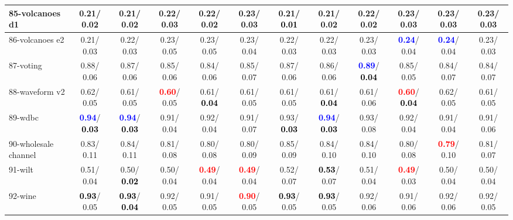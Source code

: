 \begin{table}[h]
\begin{center}
{\begin{tabular}{lc|c|c|c|c|c|c|c|c|c|c}
85-volcanoes d1 &   0.21/  0.02 &   0.21/  0.02 &   0.22/  0.03 &   0.22/  0.02 &   0.23/  0.03 &   0.21/\textcolor{black}{\textbf{  0.01}} &   0.21/  0.02 &   0.22/  0.02 &   0.23/  0.03 &   0.23/  0.03 &   0.23/  0.03 \\ \hline
86-volcanoes e2 &   0.21/  0.03 &   0.22/  0.03 &   0.23/  0.05 &   0.23/  0.05 &   0.23/  0.04 &   0.22/  0.03 &   0.22/  0.03 &   0.23/  0.03 & \textcolor{blue}{\textbf{  0.24}}/  0.04 & \textcolor{blue}{\textbf{  0.24}}/  0.04 &   0.23/  0.03 \\
87-voting &   0.88/  0.06 &   0.87/  0.06 &   0.85/  0.06 &   0.84/  0.06 &   0.85/  0.07 &   0.87/  0.06 &   0.86/  0.06 & \textcolor{blue}{\textbf{  0.89}}/\textcolor{black}{\textbf{  0.04}} &   0.85/  0.05 &   0.84/  0.07 &   0.84/  0.07 \\
88-waveform v2 &   0.62/  0.05 &   0.61/  0.05 & \textcolor{red}{\textbf{  0.60}}/  0.05 &   0.61/\textcolor{black}{\textbf{  0.04}} &   0.61/  0.05 &   0.61/  0.05 &   0.61/\textcolor{black}{\textbf{  0.04}} &   0.61/  0.06 & \textcolor{red}{\textbf{  0.60}}/\textcolor{black}{\textbf{  0.04}} &   0.62/  0.05 &   0.61/  0.05 \\
89-wdbc & \textcolor{blue}{\textbf{  0.94}}/\textcolor{black}{\textbf{  0.03}} & \textcolor{blue}{\textbf{  0.94}}/\textcolor{black}{\textbf{  0.03}} &   0.91/  0.04 &   0.92/  0.04 &   0.91/  0.07 &   0.93/\textcolor{black}{\textbf{  0.03}} & \textcolor{blue}{\textbf{  0.94}}/\textcolor{black}{\textbf{  0.03}} &   0.93/  0.08 &   0.92/  0.04 &   0.91/  0.04 &   0.91/  0.06 \\
90-wholesale channel &   0.83/  0.11 &   0.84/  0.11 &   0.81/  0.08 &   0.80/  0.08 &   0.80/  0.09 &   0.85/  0.09 &   0.84/  0.10 &   0.84/  0.10 &   0.80/  0.08 & \textcolor{red}{\textbf{  0.79}}/  0.10 &   0.81/  0.07 \\
91-wilt &   0.51/  0.04 &   0.50/\textcolor{black}{\textbf{  0.02}} &   0.50/  0.04 & \textcolor{red}{\textbf{  0.49}}/  0.04 & \textcolor{red}{\textbf{  0.49}}/  0.04 &   0.52/  0.07 & \textcolor{black}{\textbf{  0.53}}/  0.07 &   0.51/  0.04 & \textcolor{red}{\textbf{  0.49}}/  0.03 &   0.50/  0.04 &   0.50/  0.04 \\
92-wine & \textcolor{black}{\textbf{  0.93}}/  0.05 & \textcolor{black}{\textbf{  0.93}}/\textcolor{black}{\textbf{  0.04}} &   0.92/  0.05 &   0.91/  0.05 & \textcolor{red}{\textbf{  0.90}}/  0.05 & \textcolor{black}{\textbf{  0.93}}/  0.05 & \textcolor{black}{\textbf{  0.93}}/  0.05 &   0.92/  0.06 &   0.91/  0.06 &   0.92/  0.06 &   0.92/  0.05 \\ \hline

\end{tabular}}
\end{center}
\end{table}
